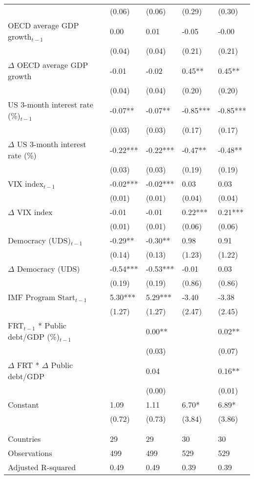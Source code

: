 \begin{tabular}{lp{3cm}p{3cm}p{3cm}p{3cm}}
   & (0.06) & (0.06) & (0.29) & (0.30) \\ 
  OECD average GDP growth$_{t-1}$ & 0.00 & 0.01 & -0.05 & -0.00 \\ 
   & (0.04) & (0.04) & (0.21) & (0.21) \\ 
  $\Delta$ OECD average GDP growth & -0.01 & -0.02 & 0.45** & 0.45** \\ 
   & (0.04) & (0.04) & (0.20) & (0.20) \\ 
  US 3-month interest rate (\%)$_{t-1}$ & -0.07** & -0.07** & -0.85*** & -0.85*** \\ 
   & (0.03) & (0.03) & (0.17) & (0.17) \\ 
  $\Delta$ US 3-month interest rate (\%) & -0.22*** & -0.22*** & -0.47** & -0.48** \\ 
   & (0.03) & (0.03) & (0.19) & (0.19) \\ 
  VIX index$_{t-1}$ & -0.02*** & -0.02*** & 0.03 & 0.03 \\ 
   & (0.01) & (0.01) & (0.04) & (0.04) \\ 
  $\Delta$ VIX index & -0.01 & -0.01 & 0.22*** & 0.21*** \\ 
   & (0.01) & (0.01) & (0.06) & (0.06) \\ 
  Democracy (UDS)$_{t-1}$ & -0.29** & -0.30** & 0.98 & 0.91 \\ 
   & (0.14) & (0.13) & (1.23) & (1.22) \\ 
  $\Delta$ Democracy (UDS) & -0.54*** & -0.53*** & -0.01 & 0.03 \\ 
   & (0.19) & (0.19) & (0.86) & (0.86) \\ 
  IMF Program Start$_{t-1}$ & 5.30*** & 5.29*** & -3.40 & -3.38 \\ 
   & (1.27) & (1.27) & (2.47) & (2.45) \\ 
  FRT$_{t-1}$ * Public debt/GDP (\%)$_{t-1}$ &  & 0.00** &  & 0.02** \\ 
   &  & (0.03) &  & (0.07) \\ 
  $\Delta$ FRT * $\Delta$ Public debt/GDP &  & 0.04 &  & 0.16** \\ 
   &  & (0.00) &  & (0.01) \\ 
  Constant & 1.09 & 1.11 & 6.70* & 6.89* \\ 
   & (0.72) & (0.73) & (3.84) & (3.86) \\ 
   &  &  &  &  \\ 
   &  &  &  &  \\ 
  Countries & 29 & 29 & 30 & 30 \\ 
  Observations & 499 & 499 & 529 & 529 \\ 
  Adjusted R-squared & 0.49 & 0.49 & 0.39 & 0.39 \\ 
   \hline
\end{tabular}
\endgroup
